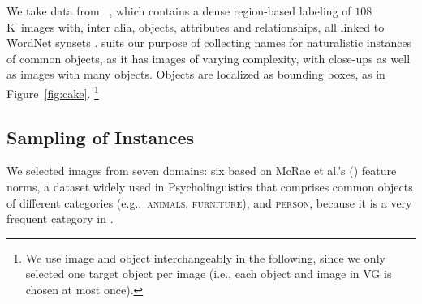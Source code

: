 
We take data from \vg~\cite{krishna2016visualgenome}, which
contains a dense region-based labeling of $108$K~images with, inter alia, objects, attributes and relationships,  %
all linked to WordNet synsets \cite{fellbaum1998wordnet}.
\vg suits our purpose of collecting names for naturalistic instances of common objects, as it has images of varying complexity, with close-ups as well as images with many objects.
Objects are localized as 
 bounding boxes, as in Figure~\ref{fig:cake}.%
\footnote{We use image and object interchangeably in the following, since we only selected one target object per image (i.e., each object and image in VG is chosen at most once).}

\subsection{Sampling of Instances}
\label{ssec:sampling}
We selected images from seven domains: six based on McRae et al.'s  (\cite{mcrae2005semantic}) feature norms, a dataset widely used in Psycholinguistics that comprises common objects of different categories (e.g.,~\textsc{animals}, \textsc{furniture}), and \textsc{person}, because it is a very frequent category in \vg.

